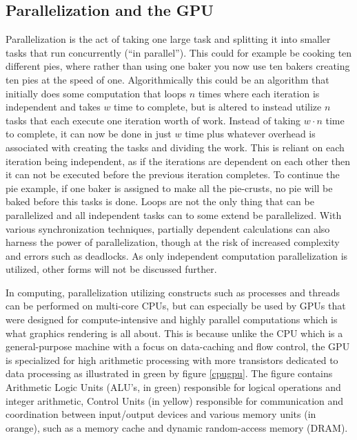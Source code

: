 \subsection{Parallelization and the GPU}\label{subsec:background:parallelization}
Parallelization is the act of taking one large task and splitting it into smaller tasks that run concurrently (``in parallel'').
This could for example be cooking ten different pies, where rather than using one baker you now use ten bakers creating ten pies at the speed of one.
Algorithmically this could be an algorithm that initially does some computation that loops $n$ times where each iteration is independent and takes $w$ time to complete, but is altered to instead utilize $n$ tasks that each execute one iteration worth of work.
Instead of taking $w \cdot n$ time to complete, it can now be done in just $w$ time plus whatever overhead is associated with creating the tasks and dividing the work.
This is reliant on each iteration being independent, as if the iterations are dependent on each other then it can not be executed before the previous iteration completes.
To continue the pie example, if one baker is assigned to make all the pie-crusts, no pie will be baked before this tasks is done.
Loops are not the only thing that can be parallelized and all independent tasks can to some extend be parallelized. 
With various synchronization techniques, partially dependent calculations can also harness the power of parallelization, though at the risk of increased complexity and errors such as deadlocks.
As only independent computation parallelization is utilized, other forms will not be discussed further.

In computing, parallelization utilizing constructs such as processes and threads can be performed on multi-core CPUs, but can especially be used by GPUs that were designed for compute-intensive and highly parallel computations which is what graphics rendering is all about.
This is because unlike the CPU which is a general-purpose machine with a focus on data-caching and flow control, the GPU is specialized for high arithmetic processing with more transistors dedicated to data processing as illustrated in green by figure \ref{cpugpu}. 
The figure contains Arithmetic Logic Units (ALU's, in green) responsible for logical operations and integer arithmetic, Control Units (in yellow) responsible for communication and coordination between input/output devices and various memory units (in orange), such as a memory cache and dynamic random-access memory (DRAM).

